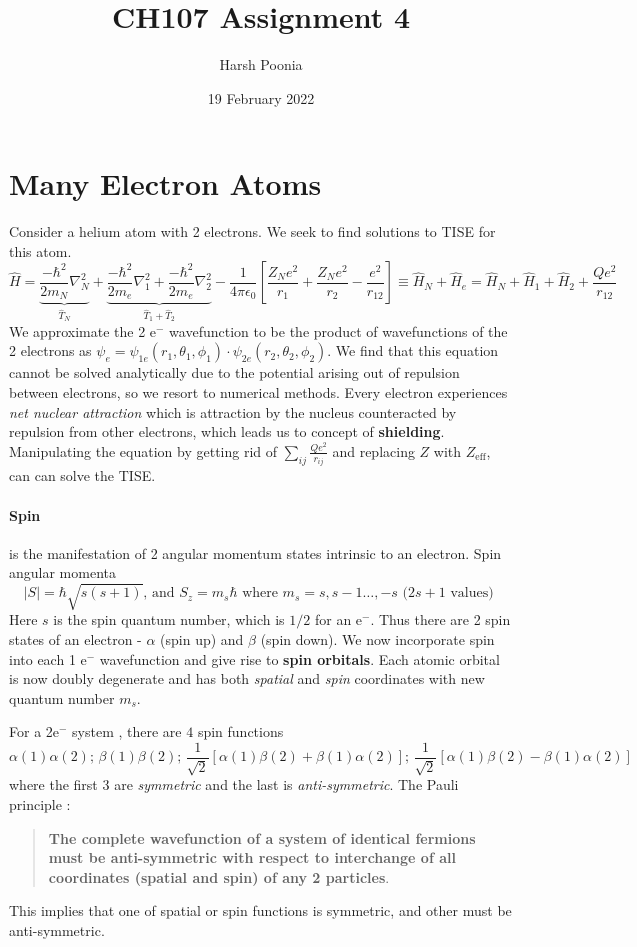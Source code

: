 \documentclass[11pt]{article}
\title{CH107 Assignment 4}
\author{Harsh Poonia}
\date{19 February 2022}
\begin{document}
\maketitle

\section{Many Electron Atoms}
Consider a helium atom with 2 electrons. We seek to find solutions to TISE for this atom. 
\[\hat{H} = \underbrace{\frac{-\hbar^2}{2m_N}\nabla_N^2}_{\hat{T}_N} + \underbrace{\frac{-\hbar^2}{2m_e}\nabla_1^2 +  \frac{-\hbar^2}{2m_e}\nabla_2^2}_{\hat{T}_1+\hat{T}_2} -\frac{1}{4\pi \epsilon_0} \left[ \frac{Z_Ne^2}{r_1} + \frac{Z_Ne^2}{r_2} - \frac{e^2}{r_{12}} \right] \equiv \hat{H}_N + \hat{H}_e = \hat{H}_N +  \hat{H}_1 + \hat{H}_2 + \frac{Qe^2}{r_{12}} \]
We approximate the 2 e$^-$ wavefunction to be the product of wavefunctions of the 2 electrons as $\psi_e = \psi_{1e}(r_1, \theta_1, \phi_1)\cdot  \psi_{2e}(r_2, \theta_2, \phi_2)$.
We find that this equation cannot be solved analytically due to the potential arising out of repulsion between electrons, so we resort to numerical methods. Every electron experiences \emph{net nuclear attraction} which is attraction by the nucleus counteracted by repulsion from other electrons, which leads us to concept of \textbf{shielding}. Manipulating the equation by getting rid of $\sum_{ij} \frac{Qe^2}{r_{ij}} $ and replacing $Z$ with $Z_{\textrm{eff}}$, can can solve the TISE.
\paragraph{Spin}
is the manifestation of 2 angular momentum states intrinsic to an electron. Spin angular momenta 
\[|S|=\hbar\sqrt{s(s+1)} \textrm{, and } S_z = m_s\hbar \textrm{ where } m_s=s, s-1 \ldots ,-s \textrm{ ($2s+1$ values) }\]
Here $s$ is the spin quantum number, which is $1/2$ for an e$^-$. Thus there are 2 spin states of an electron - $\alpha$ (spin up) and $\beta$ (spin down). We now incorporate spin into each 1 e$^-$ wavefunction and give rise to \textbf{spin orbitals}. Each atomic orbital is now doubly degenerate and has both \emph{spatial} and \emph{spin} coordinates with new quantum number $m_s$.

For a 2e$^-$ system , there are $4$ spin functions 
\[\alpha(1)\alpha(2) \textrm{;    }\beta(1)\beta(2) \textrm{;    } \frac{1}{\sqrt{2}} \left[ \alpha(1)\beta(2) + \beta(1) \alpha(2) \right] \textrm{;    } \frac{1}{\sqrt{2}} \left[ \alpha(1)\beta(2) - \beta(1) \alpha(2) \right] \]
where the first 3 are \emph{symmetric} and the last is \emph{anti-symmetric}. The Pauli principle : 
\begin{quote}
    \textbf{The complete wavefunction of a system of identical fermions must be anti-symmetric with respect to interchange of all coordinates (spatial and spin) of any 2 particles}.
\end{quote}
This implies that one of spatial or spin functions is symmetric, and other must be anti-symmetric.
\end{document}
